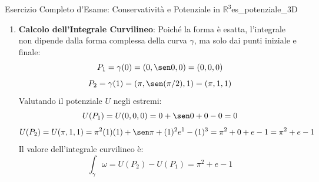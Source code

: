 \begin{esempio}{Esercizio Completo d'Esame: Conservativit\`a e Potenziale in $\mathbb{R}^3$}{es_potenziale_3D}
\begin{enumerate}
    \item \textbf{Calcolo dell'Integrale Curvilineo}: Poiché la forma è esatta, l'integrale non dipende dalla forma complessa della curva $\gamma$, ma solo dai punti iniziale e finale:
    \[
    P_1 = \gamma(0) = (0, \sen 0, 0) = (0, 0, 0)
    \]
    \[
    P_2 = \gamma(1) = (\pi, \sen(\pi/2), 1) = (\pi, 1, 1)
    \]
    Valutando il potenziale $U$ negli estremi:
    \[
    U(P_1) = U(0,0,0) = 0 + \sen 0 + 0 - 0 = 0
    \]
    \[
    U(P_2) = U(\pi, 1, 1) = \pi^2(1)(1) + \sen\pi + (1)^2 e^1 - (1)^3 = \pi^2 + 0 + e - 1 = \pi^2 + e - 1
    \]
    Il valore dell'integrale curvilineo è:
    \[
    \int_\gamma \omega = U(P_2) - U(P_1) = \pi^2 + e - 1
    \]
\end{enumerate}
\end{esempio}
